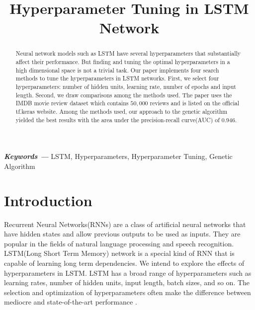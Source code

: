 \documentclass[conference]{IEEEtran}
\providecommand{\keywords}[1]{\textbf{\textit{Keywords ---}} #1}
\begin{document}
\title{Hyperparameter Tuning in LSTM Network}
\author{
}

\maketitle

\begin{abstract}
Neural network models such as LSTM have several hyperparameters that substantially affect their performance. But finding and tuning the optimal hyperparameters in a high dimensional space is not a trivial task. Our paper implements four search methods to tune the hyperparameters in LSTM networks. First, we select four hyperparameters: number of hidden units, learning rate, number of epochs and input length. Second, we draw comparisons among the methods used. The paper uses the IMDB movie review dataset which contains $50,000$ reviews and is listed on the official tf.keras website. Among the methods used, our approach to the genetic algorithm yielded the best results with the area under the precision-recall curve(AUC) of $0.946$.
\end{abstract}

\keywords{LSTM, Hyperparameters, Hyperparameter Tuning, Genetic Algorithm}
\section{Introduction}
Recurrent Neural Networks(RNNs) are a class of artificial neural networks that have hidden states and allow previous outputs to be used as inputs.
They are popular in the fields of natural language processing and speech recognition. 
LSTM(Long Short Term Memory) network \cite{lstm} is a special kind of RNN that is capable of learning long term dependencies. 
We intend to explore the effects of hyperparameters in LSTM.
LSTM has a broad range of hyperparameters such as learning rates, number of hidden units, input length, batch sizes, and so on.
The selection and optimization of hyperparameters often make the difference between mediocre and state-of-the-art performance \cite{hutter}.
\end{document}
